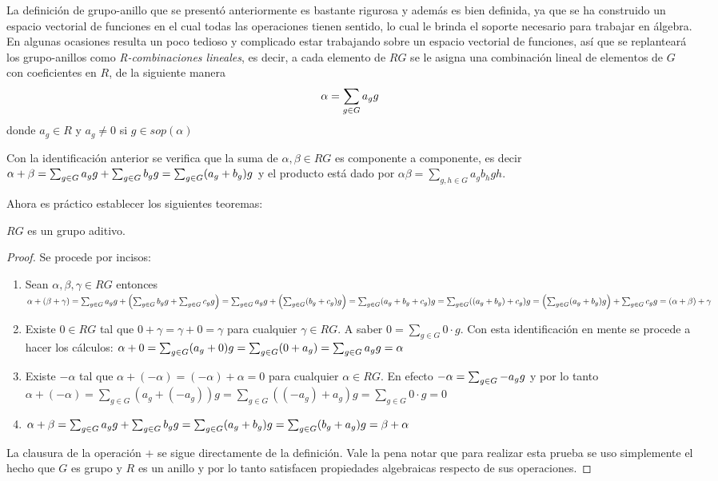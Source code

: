 La definición de grupo-anillo que se presentó anteriormente es bastante rigurosa y además es bien definida, ya que se ha construido un espacio vectorial de funciones en el cual todas las operaciones tienen sentido, lo cual le brinda el soporte necesario para trabajar en álgebra. En algunas ocasiones resulta un poco tedioso y complicado estar trabajando sobre un espacio vectorial de funciones, así que se replanteará los grupo-anillos como \textit{R-combinaciones lineales}, es decir, a cada elemento de $RG$ se le asigna una combinación lineal de elementos de $G$ con coeficientes en $R$, de la siguiente manera
\begin{equation}
\alpha = \sum_{g \in G} a_{g} g
\end{equation}
donde $a_g \in R$ y $a_g \neq 0$ si $g \in sop(\alpha)$
\begin{nota}
Con la identificación anterior se verifica que la suma de $\alpha, \beta \in RG$ es componente a componente, es decir $\alpha + \beta= \sum_{g \in G} a_{g} g+\sum_{g \in G} b_{g} g= \sum_{g\in G} (a_g+b_g)g $ y el producto está dado por $\alpha\beta=\sum_{g,h\in G}a_gb_hgh$.
\end{nota}
Ahora es práctico establecer los siguientes teoremas:
\begin{teorema}\label{grupo}
$RG$ es un grupo aditivo.
\end{teorema}
\begin{proof}
Se procede por incisos:
\begin{enumerate}
\item  Sean $\alpha, \beta, \gamma \in RG$ entonces $\alpha+(\beta+\gamma)=\sum_{g \in G} a_{g} g+\left(\sum_{g \in G} b_{g} g+ \sum_{g \in G} c_{g} g \right)= \sum_{g \in G} a_{g} g+\left(\sum_{g\in G}(b_g+c_g)g\right)=\sum_{g\in G}(a_g+b_g+c_g)g= \sum_{g\in G}((a_g+b_g)+c_g)g=\left(\sum_{g\in G}(a_g+b_g)g \right) +\sum_{g \in G} c_{g} g=(\alpha+\beta)+\gamma $

\item Existe $0 \in RG$ tal que $0+\gamma=\gamma+0=\gamma$ para cualquier $\gamma \in RG$. A saber $0=\sum_{g \in G}0\cdot g$. Con esta identificación en mente se procede a hacer los cálculos: $\alpha + 0 = \sum_{g \in G}(a_g+0)g=\sum_{g\in G}(0+a_g)=\sum_{g \in G} a_{g} g=\alpha$

\item Existe $-\alpha$ tal que $\alpha+(-\alpha)= (-\alpha)+\alpha =0$ para cualquier $\alpha \in RG$. En efecto $-\alpha = \sum_{g \in G} -a_{g} g$ y por lo tanto $\alpha+ (-\alpha)=\sum_{g\in G}(a_g+(-a_g) )g= \sum_{g\in G}((-a_g)+a_g)g = \sum_{g \in G}0\cdot g = 0 $

\item $\alpha + \beta = \sum_{g \in G} a_{g} g+\sum_{g \in G} b_{g} g=\sum_{g \in G}(a_g+b_g)g= \sum_{g \in G}(b_g+a_g)g=\beta + \alpha $ \qedhere
\end{enumerate}

La clausura de la operación $+$  se sigue directamente de la definición. Vale la pena notar que para realizar esta prueba se uso simplemente el hecho que $G$ es grupo y $R$ es un anillo y por lo tanto satisfacen propiedades algebraicas respecto de sus operaciones.
\end{proof}
